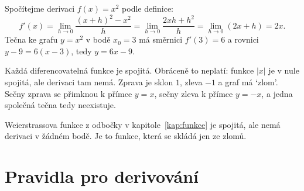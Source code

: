 \begin{example}\label{ex:derivace-x2}
  Spočítejme derivaci $f(x) = x^2$ podle definice:
  \begin{equation*}
    f'(x) = \lim_{h\to 0}\frac{{(x + h)}^2 - x^2}{h} = \lim_{h\to 0}\frac{2xh + h^2}{h} = \lim_{h\to 0}(2x + h) = 2x.
  \end{equation*}
  Tečna ke grafu $y = x^2$ v bodě $x_0 = 3$ má směrnici $f'(3) = 6$ a rovnici $y - 9 = 6(x - 3)$, tedy $y = 6x - 9$.
\end{example}

\begin{note}\label{note:spojitost-derivace}
  Každá diferencovatelná funkce je spojitá. Obráceně to neplatí: funkce $|x|$ je v nule spojitá, ale derivaci tam nemá. Zprava je sklon $1$, zleva $-1$ a graf má `zlom'. Sečny zprava se přimknou k přímce $y = x$, sečny zleva k přímce $y = -x$, a jedna společná tečna tedy neexistuje.
  \begin{center}
  \end{center}
  Weierstrassova funkce z odbočky v kapitole~\ref{kap:funkce} je spojitá, ale nemá derivaci v žádném bodě. Je to funkce, která se skládá jen ze zlomů.
\end{note}

\section{Pravidla pro derivování}\label{sec:pravidla-derivovani}

